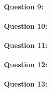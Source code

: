\reponse[3]

\paragraph{Question 9:}

\reponse[3]

\paragraph{Question 10:}

\reponse[3]

\paragraph{Question 11:}

\reponse[3]

\paragraph{Question 12:}

\reponse[4]

\paragraph{Question 13:}

